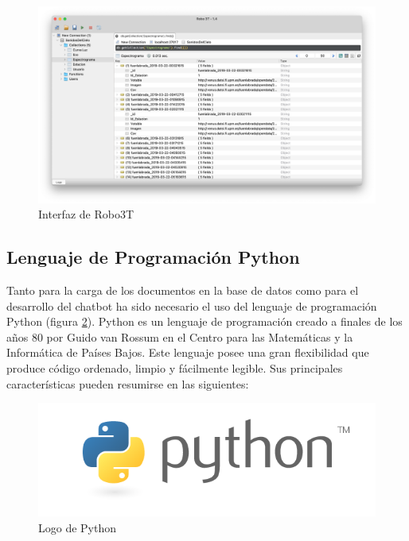 \begin{figure}[H]
    \centering
    \includegraphics[scale=0.3]{include/capturas/Robo3T.png}
    \caption{Interfaz de Robo3T}
    \label{fig:robo3t}
\end{figure}

\newpage
\subsection{Lenguaje de Programación Python}

Tanto para la carga de los documentos en la base de datos como para el desarrollo del chatbot ha sido necesario el uso del lenguaje de programación Python (figura \ref{fig:Python}). Python es un lenguaje de programación creado a finales de los años 80 por Guido van Rossum en el Centro para las Matemáticas y la Informática de Países Bajos. Este lenguaje posee una gran flexibilidad que produce código ordenado, limpio y fácilmente legible. Sus principales características pueden resumirse en las siguientes\cite{python}:

\begin{figure}[h]
    \centering
    \includegraphics[scale=0.4]{include/figuras/python.png}
    \caption{Logo de Python}
    \label{fig:Python}
\end{figure}

